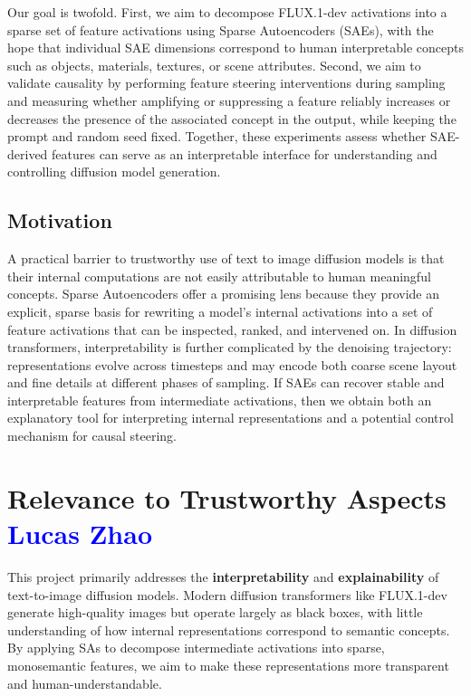\documentclass{article}
\begin{document}
Our goal is twofold. First, we aim to decompose FLUX.1-dev activations into a sparse set of feature activations using Sparse Autoencoders (SAEs), with the hope that individual SAE dimensions correspond to human interpretable concepts such as objects, materials, textures, or scene attributes. Second, we aim to validate causality by performing feature steering interventions during sampling and measuring whether amplifying or suppressing a feature reliably increases or decreases the presence of the associated concept in the output, while keeping the prompt and random seed fixed. Together, these experiments assess whether SAE-derived features can serve as an interpretable interface for understanding and controlling diffusion model generation.

\subsection{Motivation}
A practical barrier to trustworthy use of text to image diffusion models is that their internal computations are not easily attributable to human meaningful concepts. Sparse Autoencoders offer a promising lens because they provide an explicit, sparse basis for rewriting a model’s internal activations into a set of feature activations that can be inspected, ranked, and intervened on. In diffusion transformers, interpretability is further complicated by the denoising trajectory: representations evolve across timesteps and may encode both coarse scene layout and fine details at different phases of sampling. If SAEs can recover stable and interpretable features from intermediate activations, then we obtain both an explanatory tool for interpreting internal representations and a potential control mechanism for causal steering.

\section{Relevance to Trustworthy Aspects \textcolor{blue}{Lucas Zhao}}

This project primarily addresses the \textbf{interpretability} and \textbf{explainability} of text-to-image diffusion models. Modern diffusion transformers like FLUX.1-dev generate high-quality images but operate largely as black boxes, with little understanding of how internal representations correspond to semantic concepts. By applying SAs to decompose intermediate activations into sparse, monosemantic features, we aim to make these representations more transparent and human-understandable.
\end{document}
